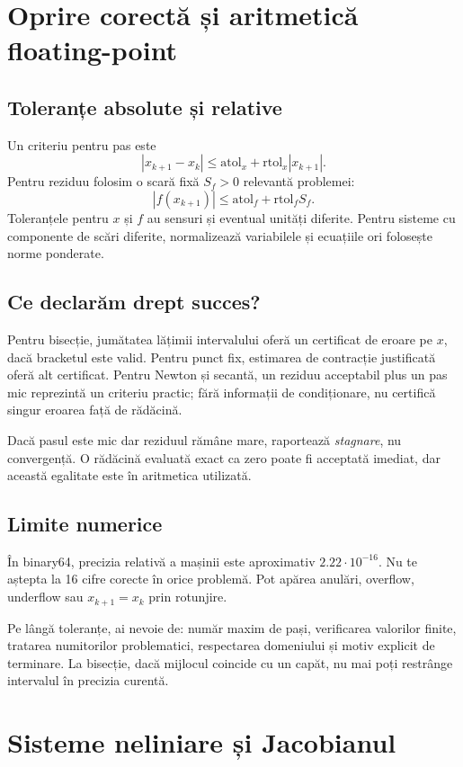 \documentclass[11pt,a4paper]{article}
\begin{document}
\section{Oprire corectă și aritmetică floating-point}
\subsection{Toleranțe absolute și relative}
Un criteriu pentru pas este
\[
|x_{k+1}-x_k|\le\mathrm{atol}_x+\mathrm{rtol}_x|x_{k+1}|.
\]
Pentru reziduu folosim o scară fixă $S_f>0$ relevantă problemei:
\[
|f(x_{k+1})|\le\mathrm{atol}_f+\mathrm{rtol}_f S_f.
\]
Toleranțele pentru $x$ și $f$ au sensuri și eventual unități diferite. Pentru sisteme cu componente de scări diferite, normalizează variabilele și ecuațiile ori folosește norme ponderate.

\subsection{Ce declarăm drept succes?}
Pentru bisecție, jumătatea lățimii intervalului oferă un certificat de eroare pe $x$, dacă bracketul este valid. Pentru punct fix, estimarea de contracție justificată oferă alt certificat. Pentru Newton și secantă, un reziduu acceptabil plus un pas mic reprezintă un criteriu practic; fără informații de condiționare, nu certifică singur eroarea față de rădăcină.

Dacă pasul este mic dar reziduul rămâne mare, raportează \textit{stagnare}, nu convergență. O rădăcină evaluată exact ca zero poate fi acceptată imediat, dar această egalitate este în aritmetica utilizată.

\subsection{Limite numerice}
În binary64, precizia relativă a mașinii este aproximativ $2.22\cdot10^{-16}$. Nu te aștepta la 16 cifre corecte în orice problemă. Pot apărea anulări, overflow, underflow sau $x_{k+1}=x_k$ prin rotunjire.

Pe lângă toleranțe, ai nevoie de: număr maxim de pași, verificarea valorilor finite, tratarea numitorilor problematici, respectarea domeniului și motiv explicit de terminare. La bisecție, dacă mijlocul coincide cu un capăt, nu mai poți restrânge intervalul în precizia curentă.

\section{Sisteme neliniare și Jacobianul}
\end{document}

